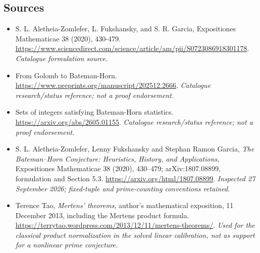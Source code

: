 \documentclass[11pt,a4paper]{article}
\numberwithin{equation}{section}
\begin{document}
\needspace{170mm}
\subsection{Sources}
\begin{itemize}\raggedright
\item[\textnormal{[S1]}]\hypertarget{source:83:1}{} S. L. Aletheia-Zomlefer, L. Fukshansky, and S. R. Garcia, Expositiones Mathematicae 38 (2020), 430-479.
\url{https://www.sciencedirect.com/science/article/am/pii/S0723086918301178}.
{\small\textit{Catalogue formulation source.}}
\item[\textnormal{[S2]}]\hypertarget{source:83:2}{} From Golomb to Bateman-Horn.
\url{https://www.preprints.org/manuscript/202512.2666}.
{\small\textit{Catalogue research/status reference; not a proof endorsement.}}
\item[\textnormal{[S3]}]\hypertarget{source:83:3}{} Sets of integers satisfying Bateman-Horn statistics.
\url{https://arxiv.org/abs/2605.01155}.
{\small\textit{Catalogue research/status reference; not a proof endorsement.}}
\item[\textnormal{[E1]}]\hypertarget{extra:83:1}{} S. L. Aletheia-Zomlefer,
Lenny Fukshansky and Stephan Ramon Garcia, \emph{The Bateman--Horn Conjecture:
Heuristics, History, and Applications}, Expositiones Mathematicae 38 (2020),
430--479; arXiv:1807.08899, formulation and Section 5.3.
\url{https://arxiv.org/html/1807.08899}.
{\small\textit{Inspected 27 September 2026; fixed-tuple and prime-counting
conventions retained.}}
\item[\textnormal{[E2]}]\hypertarget{extra:83:2}{} Terence Tao,
\emph{Mertens' theorems}, author's mathematical exposition, 11 December 2013,
including the Mertens product formula.
\url{https://terrytao.wordpress.com/2013/12/11/mertens-theorems/}.
{\small\textit{Used for the classical product normalization in the solved
linear calibration, not as support for a nonlinear prime conjecture.}}
\end{itemize}
\end{document}
